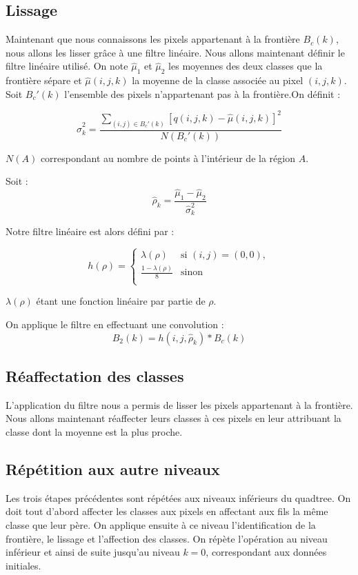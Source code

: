 \subsection{Lissage}
	Maintenant que nous connaissons les pixels appartenant à la frontière $B_c(k)$, nous allons les lisser grâce à une filtre linéaire. Nous allons maintenant définir le filtre linéaire utilisé.
	On note $\hat{\mu}_1$ et $\hat{\mu}_2$ les moyennes des deux classes que la frontière sépare et $\hat{\mu}(i,j,k)$ la moyenne de la classe associée au pixel $(i,j,k)$.\\

	Soit $B_c'(k)$ l'ensemble des pixels n'appartenant pas à la frontière.On définit :

	\[ \hat{\sigma}_k^2 = \frac{\sum\limits_{(i,j) \in B_c'(k)}[q(i,j,k)-\hat{\mu}(i,j,k)]^2}{N(B_c'(k))} \]

	$N(A)$ correspondant au nombre de points à l'intérieur de la région $A$.

	Soit :
	\[ \hat{\rho}_k = \frac{\hat{\mu}_1 - \hat{\mu}_2}{\hat{\sigma}_k^2} \]

	Notre filtre linéaire est alors défini par :

	\[ h(\rho) = \left\lbrace\begin{array}{cc}
		\lambda(\rho) & \mbox{si } (i,j) = (0,0), \\
		\frac{1 - \lambda(\rho)}{8} & \mbox{sinon}\\
	\end{array}\right.
	\]

	$\lambda(\rho)$ étant une fonction linéaire par partie de $\rho$.

	On applique le filtre en effectuant une convolution :
	\[ B_2(k) = h(i,j,\hat{\rho}_k) * B_c(k) \]

\subsection{Réaffectation des classes}
	L'application du filtre nous a permis de lisser les pixels appartenant à la frontière. Nous allons maintenant réaffecter leurs classes à ces pixels en leur attribuant la classe dont la moyenne est la plus proche.

\subsection{Répétition aux autre niveaux}
	Les trois étapes précédentes sont répétées aux niveaux inférieurs du quadtree. On doit tout d'abord affecter les classes aux pixels en affectant aux fils la même classe que leur père. On applique ensuite à ce niveau l'identification de la frontière, le lissage et l'affection des classes. On répète l'opération au niveau inférieur et ainsi de suite jusqu'au niveau $k=0$, correspondant aux données initiales.